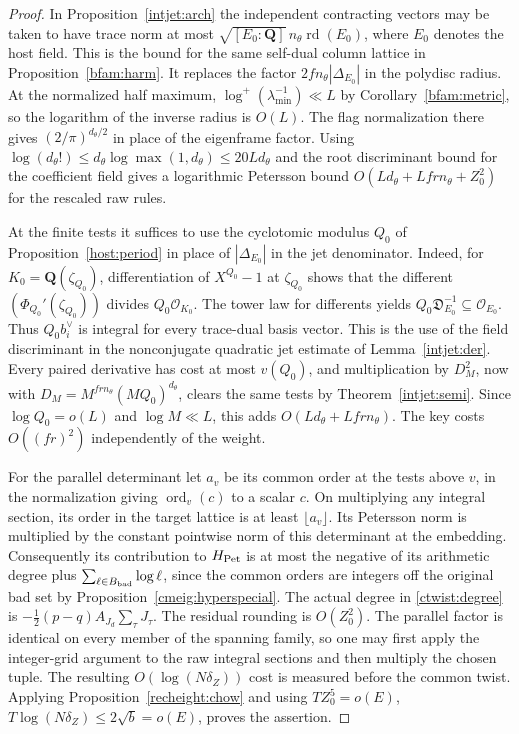 \begin{proof}
In Proposition~\ref{intjet:arch} the independent contracting
vectors may be taken to have trace norm at most
\(\sqrt{[E_0:\mathbf Q]}\,n_\theta\operatorname{rd}(E_0)\),
where \(E_0\) denotes the host field. This is the bound for the
same self-dual column lattice in Proposition~\ref{bfam:harm}.
It replaces the factor \(2fn_\theta |\Delta_{E_0}|\) in the
polydisc radius. At the normalized half maximum,
\(\log^+(\lambda_{\min}^{-1})\ll L\) by
Corollary~\ref{bfam:metric}, so the logarithm of the inverse
radius is \(O(L)\). The flag normalization there gives
\((2/\pi)^{d_\theta/2}\) in place of the eigenframe factor.
Using \(\log(d_\theta!)\le d_\theta\log\max(1,d_\theta)\le20Ld_\theta\)
and the root discriminant bound for the coefficient field gives a
logarithmic Petersson bound
\(O(Ld_\theta+Lfrn_\theta+Z_0^2)\) for the rescaled raw rules.

At the finite tests it suffices to use the cyclotomic modulus
\(Q_0\) of Proposition~\ref{host:period} in place of
\(|\Delta_{E_0}|\) in the jet denominator. Indeed, for
\(K_0=\mathbf Q(\zeta_{Q_0})\), differentiation of \(X^{Q_0}-1\)
at \(\zeta_{Q_0}\) shows that the different
\((\Phi_{Q_0}'(\zeta_{Q_0}))\) divides \(Q_0\mathcal O_{K_0}\).
The tower law for differents yields
\(Q_0\mathfrak D_{E_0}^{-1}\subseteq\mathcal O_{E_0}\).
Thus \(Q_0 b_i^\vee\) is integral for every trace-dual basis vector.
This is the use of the field discriminant in the nonconjugate
quadratic jet estimate of Lemma~\ref{intjet:der}. Every paired
derivative has cost at most \(v(Q_0)\), and multiplication by
\(D_M^2\), now with \(D_M=M^{frn_\theta}(M Q_0)^{d_\theta}\),
clears the same tests by Theorem~\ref{intjet:semi}. Since
\(\log Q_0=o(L)\) and \(\log M\ll L\), this adds
\(O(Ld_\theta+Lfrn_\theta)\). The key costs
\(O((fr)^2)\) independently of the weight.

For the parallel determinant let \(a_v\) be its common order at
the tests above \(v\), in the normalization giving
\(\operatorname{ord}_v(c)\) to a scalar \(c\). On multiplying any
integral section, its order in the target lattice is at least
\(\lfloor a_v\rfloor\). Its Petersson norm is multiplied by the
constant pointwise norm of this determinant at the embedding.
Consequently its contribution to \(H_{\rm Pet}\) is at most the
negative of its arithmetic degree plus
\(\sum_{\ell\in B_{\rm bad}}\log\ell\), since the common orders
are integers off the original bad set by
Proposition~\ref{cmeig:hyperspecial}. The actual degree in
\eqref{ctwist:degree} is
\(-\frac12(p-q)A_{J_d}\sum_\tau J_\tau\). The residual rounding
is \(O(Z_0^2)\). The parallel factor is identical on every member of
the spanning family, so one may first apply the integer-grid argument
to the raw integral sections and then multiply the chosen tuple.
The resulting \(O(\log(N\delta_Z))\) cost is measured before the
common twist. Applying Proposition~\ref{recheight:chow} and using
\(TZ_0^5=o(E)\), \(T\log(N\delta_Z)\le2\sqrt b=o(E)\), proves the
assertion.
\end{proof}

